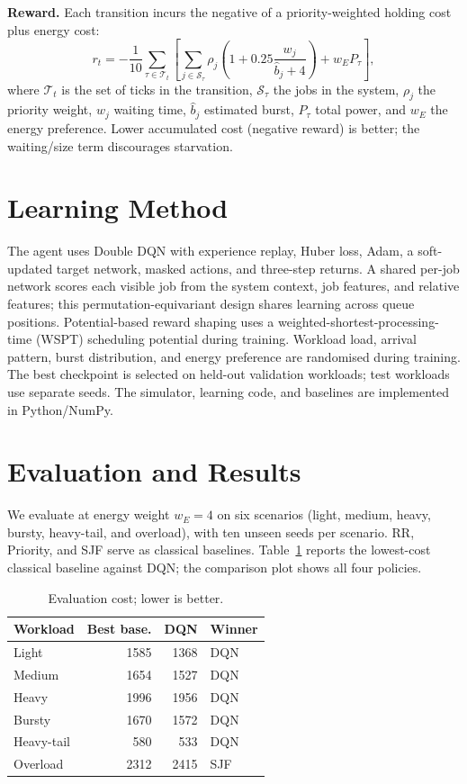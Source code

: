 \documentclass[9pt,twocolumn]{article}
\begin{document}
\textbf{Reward.} Each transition incurs the negative of a priority-weighted holding cost plus energy cost:
\[
 r_t=-\frac{1}{10}\sum_{\tau\in\mathcal T_t}\left[\sum_{j\in\mathcal S_\tau}\rho_j\left(1+0.25\frac{w_j}{\hat b_j+4}\right)+w_E P_\tau\right],
\]
where $\mathcal T_t$ is the set of ticks in the transition, $\mathcal S_\tau$ the jobs in the system, $\rho_j$ the priority weight, $w_j$ waiting time, $\hat b_j$ estimated burst, $P_\tau$ total power, and $w_E$ the energy preference. Lower accumulated cost (negative reward) is better; the waiting/size term discourages starvation.

\section{Learning Method}
The agent uses Double DQN with experience replay, Huber loss, Adam, a soft-updated target network, masked actions, and three-step returns. A shared per-job network scores each visible job from the system context, job features, and relative features; this permutation-equivariant design shares learning across queue positions. Potential-based reward shaping uses a weighted-shortest-processing-time (WSPT) scheduling potential during training. Workload load, arrival pattern, burst distribution, and energy preference are randomised during training. The best checkpoint is selected on held-out validation workloads; test workloads use separate seeds. The simulator, learning code, and baselines are implemented in Python/NumPy.

\balance
\section{Evaluation and Results}
We evaluate at energy weight $w_E=4$ on six scenarios (light, medium, heavy, bursty, heavy-tail, and overload), with ten unseen seeds per scenario. RR, Priority, and SJF serve as classical baselines. Table~\ref{tab:cost} reports the lowest-cost classical baseline against DQN; the comparison plot shows all four policies.

\begin{table}[!ht]
\centering
\caption{Evaluation cost; lower is better.}
\label{tab:cost}
\scriptsize
\begin{tabular}{lrrl}
\toprule
Workload & Best base. & DQN & Winner\\
\midrule
Light & 1585 & 1368 & DQN\\
Medium & 1654 & 1527 & DQN\\
Heavy & 1996 & 1956 & DQN\\
Bursty & 1670 & 1572 & DQN\\
Heavy-tail & 580 & 533 & DQN\\
Overload & 2312 & 2415 & SJF\\
\bottomrule
\end{tabular}
\end{table}
\end{document}
